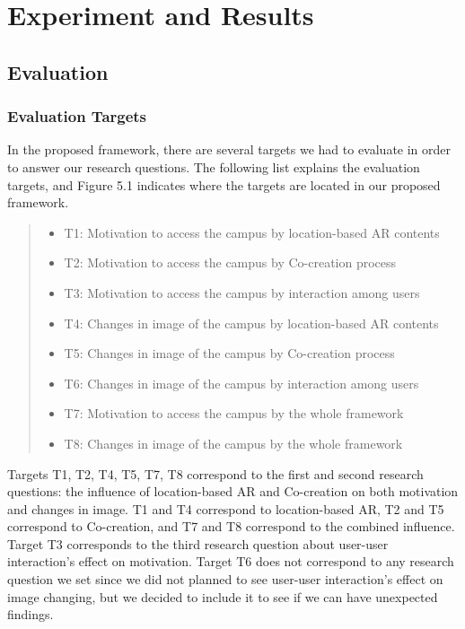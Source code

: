 \chapter{Experiment and Results}\label{ch:5}

\section{Evaluation}

\subsection{Evaluation Targets}

In the proposed framework, there are several targets we had to evaluate in order to answer our research questions.
The following list explains the evaluation targets, and Figure 5.1 indicates where the targets are located in our proposed framework.

\begin{quote}
  \begin{itemize}
    \item T1: Motivation to access the campus by location-based AR contents
    \item T2: Motivation to access the campus by Co-creation process
    \item T3: Motivation to access the campus by interaction among users
    \item T4: Changes in image of the campus by location-based AR contents
    \item T5: Changes in image of the campus by Co-creation process
    \item T6: Changes in image of the campus by interaction among users
    \item T7: Motivation to access the campus by the whole framework
    \item T8: Changes in image of the campus by the whole framework
  \end{itemize}
\end{quote}

Targets T1, T2, T4, T5, T7, T8 correspond to the first and second research questions:
the influence of location-based AR and Co-creation on both motivation and changes in image.
T1 and T4 correspond to location-based AR, T2 and T5 correspond to Co-creation, and T7 and T8 correspond to the combined influence.
Target T3 corresponds to the third research question about user-user interaction's effect on motivation.
Target T6 does not correspond to any research question we set since we did not planned to see user-user interaction's effect on image changing,
but we decided to include it to see if we can have unexpected findings.

